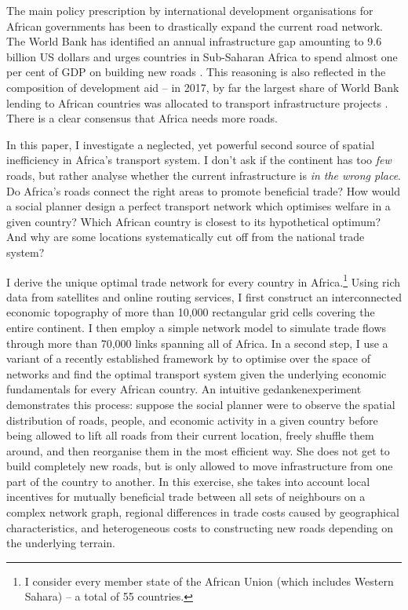 \documentclass[11pt, oneside]{article}   	%
\begin{document}
The main policy prescription by international development organisations for African governments has been to drastically expand the current road network. The World Bank has identified an annual infrastructure gap amounting to 9.6 billion US dollars and urges countries in Sub-Saharan Africa to spend almost one per cent of GDP on building new roads \citep{Foster_AfricaInfrastructureTime_2010}. This reasoning is also reflected in the composition of development aid -- in 2017, by far the largest share of World Bank lending to African countries was allocated to transport infrastructure projects \citep{TheWorldBank_WorldBankAnnual_2017}. There is a clear consensus that Africa needs more roads.

In this paper, I investigate a neglected, yet powerful second source of spatial inefficiency in Africa's transport system. I don't ask if the continent has too \emph{few} roads, but rather analyse whether the current infrastructure is \emph{in the wrong place}. Do Africa's roads connect the right areas to promote beneficial trade? How would a social planner design a perfect transport network which optimises welfare in a given country? Which African country is closest to its hypothetical optimum? And why are some locations systematically cut off from the national trade system?

I derive the unique optimal trade network for every country in Africa.\footnote{I consider every member state of the African Union (which includes Western Sahara) -- a total of 55 countries.} Using rich data from satellites and online routing services, I first construct an interconnected economic topography of more than 10,000 rectangular grid cells covering the entire continent. I then employ a simple network model to simulate trade flows through more than 70,000 links spanning all of Africa. In a second step, I use a variant of a recently established framework by \cite{fajgelbaum_optimal_2017} to optimise over the space of networks and find the optimal transport system given the underlying economic fundamentals for every African country. An intuitive gedankenexperiment demonstrates this process: suppose the social planner were to observe the spatial distribution of roads, people, and economic activity in a given country before being allowed to lift all roads from their current location, freely shuffle them around, and then reorganise them in the most efficient way. She does not get to build completely new roads, but is only allowed to move infrastructure from one part of the country to another. In this exercise, she takes into account local incentives for mutually beneficial trade between all sets of neighbours on a complex network graph, regional differences in trade costs caused by geographical characteristics, and heterogeneous costs to constructing new roads depending on the underlying terrain.
\end{document}
